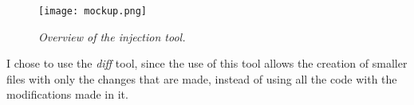 \begin{figure}[!ht]
\begin{center}
\texttt{[image: mockup.png]}
\caption{\small \sl Overview of the injection tool.\label{fig:mockup}}
\end{center}
\end{figure}

I chose to use the \textit{diff} tool, since the use of this tool allows the creation of smaller files with only the changes that are made, instead of using all the code with the modifications made in it.
